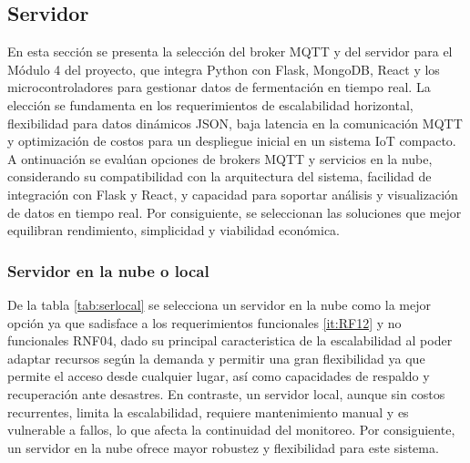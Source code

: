 \subsection{Servidor}


En esta sección se presenta la selección del broker MQTT y del servidor para el Módulo 4
del proyecto, que integra Python con Flask, MongoDB, React y los microcontroladores para gestionar
datos de fermentación en tiempo real. La elección se fundamenta en los requerimientos de escalabilidad
horizontal, flexibilidad para datos dinámicos JSON, baja latencia en la comunicación MQTT y 
optimización de costos para un despliegue inicial en un sistema IoT compacto. 
A ontinuación se evalúan opciones 
de brokers MQTT y servicios en la nube, considerando su compatibilidad con la arquitectura del 
sistema, facilidad de integración con Flask y React, y capacidad para soportar análisis y
visualización de datos en tiempo real. Por consiguiente, se seleccionan las soluciones que
mejor equilibran rendimiento, simplicidad y viabilidad económica.

\subsubsection{Servidor en la nube o local}
De la tabla  \cref{tab:serlocal} se selecciona un servidor en la nube como
la mejor opción ya que sadisface a los
requerimientos funcionales \ref{it:RF12} y no funcionales RNF04, dado su principal caracteristica de la escalabilidad 
al poder adaptar recursos según la demanda y permitir una 
gran flexibilidad ya que permite el acceso desde cualquier lugar,
así como capacidades de respaldo y recuperación ante desastres. 
En contraste, un servidor local, aunque sin costos recurrentes, 
limita la escalabilidad, requiere mantenimiento manual y es vulnerable 
a fallos, lo que afecta la continuidad del monitoreo. Por consiguiente,
un servidor en la nube ofrece mayor robustez y flexibilidad para este
sistema.

\begingroup
\setlength{\tabcolsep}{5pt} 
\renewcommand{\arraystretch}{1.5} 
\small 

